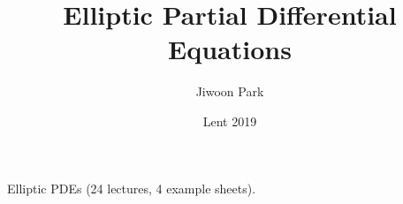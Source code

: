 \documentclass[12pt,a4paper]{article}
\DeclarePairedDelimiter\bignorm{\lVert}{\rVert}
\newcommand{\doublerule}[1][.4pt]{%
  \noindent
  \makebox[0pt][l]{\rule[.7ex]{\linewidth}{#1}}%
  \rule[.3ex]{\linewidth}{#1}}
\begin{document}
\title{Elliptic Partial Differential Equations}
\author{Jiwoon Park}
\date{Lent 2019}

\maketitle

\newcommand{\latinmodern}[1]{{\fontfamily{lmss}\selectfont
\textbf{#1}
}}

\newcommand{\statement}[1]{\latinmodern{\textbf{#1) }}}

\newcommand{\thm}{\latinmodern{Theorem) }}
\newcommand{\thmnum}[1]{\latinmodern{Theorem #1) }}
\newcommand{\defi}{\latinmodern{Definition) }}
\newcommand{\definum}[1]{\latinmodern{Definition #1) }}
\newcommand{\lem}{\latinmodern{Lemma) }}
\newcommand{\lemnum}[1]{\latinmodern{Lemma #1) }}
\newcommand{\prop}{\latinmodern{Proposition) }}
\newcommand{\propnum}[1]{\latinmodern{Proposition #1) }}
\newcommand{\corr}{\latinmodern{Corollary) }}
\newcommand{\corrnum}[1]{\latinmodern{Corollary #1) }}
\newcommand{\pf}{\textbf{proof) }}

\newcommand{\lap}{\triangle} %
\newcommand{\s}{\vspace{10pt}}
\newcommand{\bull}{$\bullet$}
\newcommand{\sta}{$\star$}
\newcommand{\reals}{\mathbb{R}}

\newcommand{\norms}[2]{\bignorm[\big]{#1}_{#2}}
\newcommand{\snorms}[2]{\bignorm[\small]{#1}_{#2}}

\newcommand{\eop}{\hfill  \textsl{(End of proof)} $\square$} %
\newcommand{\eos}{\hfill  \textsl{(End of statement)} $\square$} %

\newcommand{\intN}{\mathbb{Z}_N}
\newcommand{\nat}{\mathbb{N}}

\newcommand{\abs}[1]{\big| #1 \big|}
\newcommand{\avg}{\mathbb{E}}
\newcommand{\prob}{\mathbb{P}}
\newcommand{\borel}{\mathscr{B}}
\newcommand{\EE}{\mathscr{E}}
\newcommand{\pa}{\partial}

\newcommand{\call}[1]{\quad \cdots\cdots\cdots\,\,(#1)}

\renewcommand{\vec}{\underline}
\renewcommand{\bar}{\overline}

\def\doubleunderline#1{\underline{\underline{#1}}}

\newcommand{\newday}{\doublerule[0.5pt]}
\newcommand{\digression}{**********************************************************************************************}

\setlength\parindent{0pt}

Elliptic PDEs (24 lectures, 4 example sheets).
\end{document}
